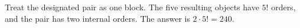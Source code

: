 Treat the designated pair as one block. The five resulting objects have $ 5!$ orders, and the pair has two internal orders. The answer is $ 2\cdot5!=\boxed{240}$.
